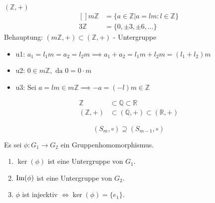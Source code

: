 \documentclass[../Algebra_script.tex]{subfiles}
\begin{document}
\begin{example}{$(\mathbb{Z}, +)$}
	\[\begin{aligned}[]
		m\mathbb{Z} &= \{a \in \mathbb{Z} | a = lm: l \in \mathbb{Z}\}\\
		3\mathbb{Z} &= \{0, \pm 3, \pm 6, \ldots\}
	\end{aligned}\]
	Behauptung: $(m\mathbb{Z}, + ) \subset (\mathbb{Z}, +)$ - Untergruppe
	\begin{itemize}
		\item{u1: } $a_1 = l_1 m = a_2 = l_2 m \implies a_1 + a_2 = l_1 m + l_2 m = (l_1 + l_2)m$
		\item{u2: } $0 \in m\mathbb{Z}, \text{ da } 0 = 0\cdot m$
		\item{u3: } Sei $a = lm \in m\mathbb{Z} \implies -a = (-l)m \in \mathbb{Z}$  
	\end{itemize}
\end{example}

\begin{example}
	\[\begin{aligned}
		\mathbb{Z} &\subset \mathbb{Q} \subset \mathbb{R}\\
		(\mathbb{Z}, +) &\subset (\mathbb{Q}, +) \subset (\mathbb{R}, +)
	\end{aligned}\]
\end{example}

\begin{example}
	\[(S_m, \circ) \supseteq (S_{m-1}, \circ)\]
\end{example}

\begin{proposition}
	Es sei $\phi: G_1 \to G_2$ ein Gruppenhomomorphismus.
	\begin{enumerate}
		\item $\ker(\phi)$ ist eine Untergruppe von $G_1$.
		\item $\operatorname{Im}(\phi)$ ist eine Untergruppe von $G_2$.
		\item $\phi$ ist injecktiv $\iff \ker(\phi) = \{e_1\}$.
	\end{enumerate}
\end{proposition}
\end{document}
